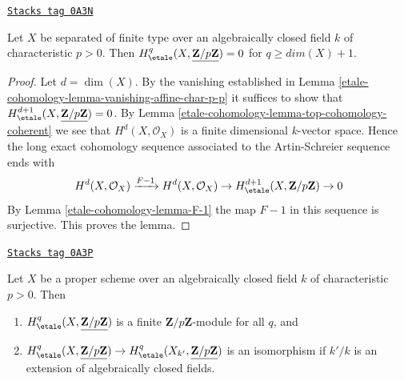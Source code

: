 \begin{lemma}
\label{etale-cohomology-lemma-vanishing-variety-char-p-p}
\href{https://stacks.math.columbia.edu/tag/0A3N}{\texttt{Stacks tag 0A3N}}

Let $X$ be separated of finite type over an algebraically closed
field $k$ of characteristic $p > 0$. Then
$H_\etale^q(X, \underline{\mathbf{Z}/p\mathbf{Z}}) = 0$ for
$q \geq dim(X) + 1$.
\end{lemma}

\begin{proof}
Let $d = \dim(X)$. By the vanishing established in
Lemma \ref{etale-cohomology-lemma-vanishing-affine-char-p-p}
it suffices to show that
$H_\etale^{d + 1}(X, \underline{\mathbf{Z}/p\mathbf{Z}}) = 0$.
By Lemma \ref{etale-cohomology-lemma-top-cohomology-coherent} we see that
$H^d(X, \mathcal{O}_X)$ is a finite dimensional $k$-vector space.
Hence the long exact cohomology sequence associated to the
Artin-Schreier sequence ends with
$$
H^d(X, \mathcal{O}_X) \xrightarrow{F - 1}
H^d(X, \mathcal{O}_X) \to H^{d + 1}_\etale(X, \mathbf{Z}/p\mathbf{Z}) \to 0
$$
By Lemma \ref{etale-cohomology-lemma-F-1} the map $F - 1$ in this sequence is surjective.
This proves the lemma.
\end{proof}

\begin{lemma}
\label{etale-cohomology-lemma-finiteness-proper-variety-char-p-p}
\href{https://stacks.math.columbia.edu/tag/0A3P}{\texttt{Stacks tag 0A3P}}

Let $X$ be a proper scheme over an algebraically closed
field $k$ of characteristic $p > 0$. Then
\begin{enumerate}
\item $H_\etale^q(X, \underline{\mathbf{Z}/p\mathbf{Z}})$
is a finite $\mathbf{Z}/p\mathbf{Z}$-module for all $q$, and
\item $H^q_\etale(X, \underline{\mathbf{Z}/p\mathbf{Z}}) \to
H^q_\etale(X_{k'}, \underline{\mathbf{Z}/p\mathbf{Z}})$
is an isomorphism if $k'/k$ is an extension of algebraically
closed fields.
\end{enumerate}
\end{lemma}

